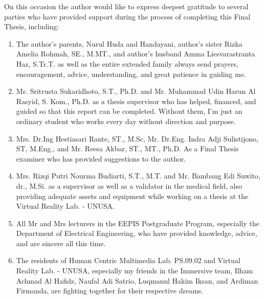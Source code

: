 
\begin{thankyou}      
On this occasion the author would like to express deepest gratitude to several parties who have provided support during the process of completing this Final Thesis, including:

\begin{enumerate}
    \item The author's parents, Nurul Huda and Handayani, author's sister Rizka Amelia Rohmah, SE., M.MT., and author's husband Amma Liesvarastranta Haz, S.Tr.T.  as well as the entire extended family always send prayers, encouragement, advice, understanding, and great patience in guiding me.
    \item Mr. Sritrusta Sukaridhoto, S.T., Ph.D. and Mr. Muhammad Udin Harun Al Rasyid, S. Kom., Ph.D. as a thesis supervisor who has helped, financed, and guided so that this report can be completed. Without them, I'm just an ordinary student who works every day without direction and purpose.
    \item Mrs. Dr.Ing Hestiasari Rante, ST., M.Sc, Mr. Dr.Eng. Indra Adji Sulistijono, ST, M.Eng., and Mr. Reesa Akbar, ST., MT., Ph.D. As a Final Thesis examiner who has provided suggestions to the author.
    \item Mrs. Rizqi Putri Nourma Budiarti, S.T., M.T. and Mr. Bambang Edi Suwito, dr., M.Si. as a supervisor as well as a validator in the medical field, also providing adequate assets and equipment while working on a thesis at the Virtual Reality Lab. - UNUSA.
    \item All Mr and Mrs lecturers in the EEPIS Postgraduate Program, especially the Department of Electrical Engineering, who have provided knowledge, advice, and are sincere all this time.
    \item The residents of Human Centric Multimedia Lab. PS.09.02 and Virtual Reality Lab. - UNUSA, especially my friends in the Immersive team, Ilham Achmad Al Hafidz, Naufal Adi Satrio, Luqmanul Hakim Iksan, and Ardiman Firmanda, are fighting together for their respective dreams.

\end{enumerate}
\end{thankyou}

